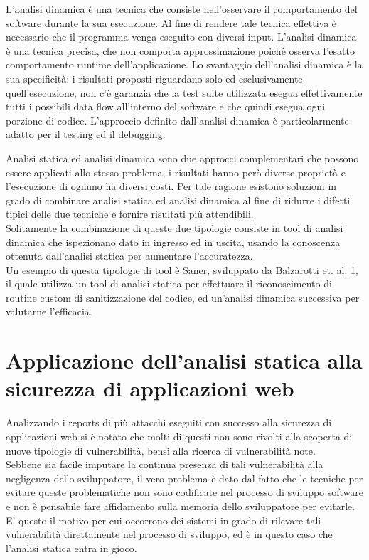 L'analisi dinamica è una tecnica che consiste nell'osservare il comportamento del software durante la sua esecuzione. Al fine di rendere tale tecnica effettiva è necessario che il programma venga eseguito con diversi input. L'analisi dinamica è una tecnica precisa, che non comporta approssimazione poichè osserva l'esatto comportamento runtime dell'applicazione.
Lo svantaggio dell'analisi dinamica è la sua specificità: i risultati proposti riguardano solo ed esclusivamente quell'esecuzione, non c'è garanzia che la test suite utilizzata esegua effettivamente tutti i possibili data flow all'interno del software e che quindi esegua ogni porzione di codice. L'approccio definito dall'analisi dinamica è particolarmente adatto per il testing ed il debugging.

Analisi statica ed analisi dinamica sono due approcci complementari che possono essere applicati allo stesso problema, i risultati hanno però diverse proprietà e l'esecuzione di ognuno ha diversi costi. Per tale ragione esistono soluzioni in grado di combinare analisi statica ed analisi dinamica al fine di ridurre i difetti tipici delle due tecniche e fornire risultati più attendibili.\\
Solitamente la combinazione di queste due tipologie consiste in tool di analisi dinamica che ispezionano dato in ingresso ed in uscita, usando la conoscenza ottenuta dall'analisi statica per aumentare l'accuratezza.\\
Un esempio di questa tipologie di tool è Saner, sviluppato da Balzarotti et. al. \ref{}, il quale utilizza un tool di analisi statica per effettuare il riconoscimento di routine custom  di sanitizzazione del codice, ed un'analisi dinamica successiva per valutarne l'efficacia. 

\chapter{Applicazione dell'analisi statica alla sicurezza di applicazioni web}

\begin{epigraphs}
\end{epigraphs}

Analizzando i reports di più attacchi eseguiti con successo alla sicurezza di applicazioni web si è notato che molti di questi non sono rivolti alla scoperta di nuove tipologie di vulnerabilità, bensì alla ricerca di vulnerabilità note.\\ Sebbene sia facile imputare la continua presenza di tali vulnerabilità alla negligenza dello sviluppatore, il vero problema è dato dal fatto che le tecniche per evitare queste problematiche non sono codificate nel processo di sviluppo software e non è pensabile fare affidamento sulla memoria dello sviluppatore per evitarle. E' questo il motivo per cui occorrono dei sistemi in grado di rilevare tali vulnerabilità direttamente nel processo di sviluppo, ed è in questo caso che l'analisi statica entra in gioco.

